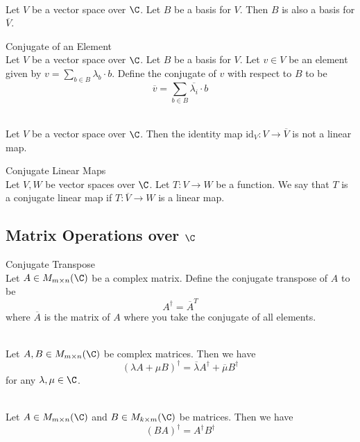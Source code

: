 \documentclass[a4paper]{article}
\begin{document}
\begin{prp}{}{}\\
Let $V$ be a vector space over $\C$. Let $B$ be a basis for $V$. Then $B$ is also a basis for $\overline{V}$. 
\end{prp}

\begin{defn}{Conjugate of an Element}{}\\
Let $V$ be a vector space over $\C$. Let $B$ be a basis for $V$. Let $v\in V$ be an element given by $v=\sum_{b\in B}\lambda_b\cdot b$. Define the conjugate of $v$ with respect to $B$ to be $$\overline{v}=\sum_{b\in B}\overline{\lambda_i}\cdot b$$
\end{defn}

\begin{eg}{}{}\\
Let $V$ be a vector space over $\C$. Then the identity map $\text{id}_V:V\to\overline{V}$ is not a linear map. 
\end{eg}

\begin{defn}{Conjugate Linear Maps}{}\\
Let $V,W$ be vector spaces over $\C$. Let $T:V\to W$ be a function. We say that $T$ is a conjugate linear map if $T:\overline{V}\to W$ is a linear map. 
\end{defn}

\subsection{Matrix Operations over $\C$}
\begin{defn}{Conjugate Transpose}{}\\
Let $A\in M_{m\times n}(\C)$ be a complex matrix. Define the conjugate transpose of $A$ to be $$A^\dagger=\overline{A}^T$$ where $\overline{A}$ is the matrix of $A$ where you take the conjugate of all elements. 
\end{defn}

\begin{prp}{}{}\\
Let $A,B\in M_{m\times n}(\C)$ be complex matrices. Then we have $$(\lambda A+\mu B)^\dagger=\overline{\lambda}A^\dagger+\overline{\mu}B^\dagger$$ for any $\lambda,\mu\in\C$. 
\end{prp}

\begin{prp}{}{}\\
Let $A\in M_{m\times n}(\C)$ and $B\in M_{k\times m}(\C)$ be matrices. Then we have $$(BA)^\dagger=A^\dagger B^\dagger$$
\end{prp}
\end{document}
